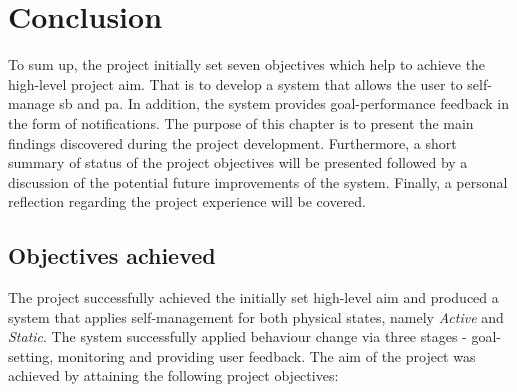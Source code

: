 \chapter{Conclusion}
To sum up, the project initially set seven objectives which help to achieve the high-level project aim. That is to develop a system that allows the user to self-manage \gls{sb} and \gls{pa}. In addition, the system provides goal-performance feedback in the form of notifications. The purpose of this chapter is to present the main findings discovered during the project development. Furthermore, a short summary of status of the project objectives will be presented followed by a discussion of the potential future improvements of the system. Finally, a personal reflection regarding the project experience will be covered. 

\section{Objectives achieved}
The project successfully achieved the initially set high-level aim and produced a system that applies self-management for both physical states, namely \textit{Active} and \textit{Static}. The system successfully applied behaviour change via three stages - goal-setting, monitoring and providing user feedback. The aim of the project was achieved by attaining the following project objectives:

